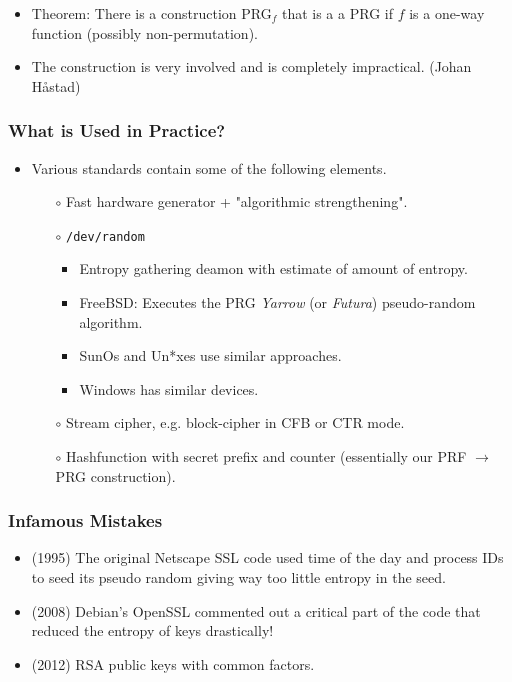 \documentclass[a4paper]{scrartcl}
\begin{document}
\begin{itemize}
\item Theorem: There is a construction PRG$_f$ that is a a PRG if $f$ is a one-way function (possibly non-permutation).
\item The construction is very involved and is completely impractical. (Johan H\aa stad)
\end{itemize}

\subsubsection*{What is Used in Practice?}

\begin{itemize}
\item Various standards contain some of the following elements.
\begin{itemize}
\item [$\circ$] Fast hardware generator + "algorithmic strengthening".
\item [$\circ$] \texttt{/dev/random}
\begin{itemize}
\item Entropy gathering deamon with estimate of amount of entropy.
\item FreeBSD: Executes the PRG \textit{Yarrow} (or \textit{Futura}) pseudo-random algorithm.
\item SunOs and Un*xes use similar approaches.
\item Windows has similar devices.
\end{itemize}
\item [$\circ$] Stream cipher, e.g. block-cipher in CFB or CTR mode.
\item [$\circ$] Hashfunction with secret prefix and counter (essentially our PRF $\rightarrow$ PRG construction).
\end{itemize}
\end{itemize}

\subsubsection*{Infamous Mistakes}

\begin{itemize}
\item (1995) The original Netscape SSL code used time of the day and process IDs to seed its pseudo random giving way too little entropy in the seed. 
\item (2008) Debian's OpenSSL commented out a critical part of the code that reduced the entropy of keys drastically!
\item (2012) RSA public keys with common factors.
\end{itemize}
\end{document}
